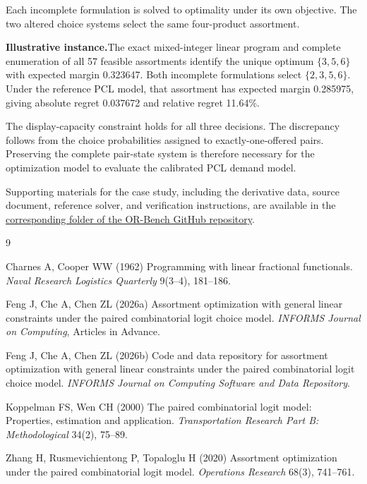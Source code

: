 \documentclass[10pt]{article}
\newcommand{\evidencebox}[1]{%
  \par\vspace{3pt}\noindent
  \colorbox{orlight}{%
    \parbox{\dimexpr\linewidth-2\fboxsep\relax}{%
      \small\textbf{Illustrative instance.}\hspace{0.35em}#1%
    }%
  }\par\vspace{4pt}
}
\begin{document}
Each incomplete formulation is solved to optimality under its own objective. The two altered choice systems select the same four-product assortment.

\evidencebox{The exact mixed-integer linear program and complete enumeration of all 57 feasible assortments identify the unique optimum $\{3,5,6\}$ with expected margin 0.323647. Both incomplete formulations select $\{2,3,5,6\}$. Under the reference PCL model, that assortment has expected margin 0.285975, giving absolute regret 0.037672 and relative regret 11.64\%.}

The display-capacity constraint holds for all three decisions. The discrepancy follows from the choice probabilities assigned to exactly-one-offered pairs. Preserving the complete pair-state system is therefore necessary for the optimization model to evaluate the calibrated PCL demand model.

Supporting materials for the case study, including the derivative data, source document, reference solver, and verification instructions, are available in the \href{https://github.com/Zhengzhong-You/OR-Bench/tree/main/problems/02_pcl_assortment}{corresponding folder of the OR-Bench GitHub repository}.

\begin{thebibliography}{9}\small

Charnes A, Cooper WW (1962)
Programming with linear fractional functionals.
\emph{Naval Research Logistics Quarterly} 9(3--4), 181--186.

Feng J, Che A, Chen ZL (2026a)
Assortment optimization with general linear constraints under the paired combinatorial logit choice model.
\emph{INFORMS Journal on Computing}, Articles in Advance.

Feng J, Che A, Chen ZL (2026b)
Code and data repository for assortment optimization with general linear constraints under the paired combinatorial logit choice model.
\emph{INFORMS Journal on Computing Software and Data Repository}.

Koppelman FS, Wen CH (2000)
The paired combinatorial logit model: Properties, estimation and application.
\emph{Transportation Research Part B: Methodological} 34(2), 75--89.

Zhang H, Rusmevichientong P, Topaloglu H (2020)
Assortment optimization under the paired combinatorial logit model.
\emph{Operations Research} 68(3), 741--761.

\end{thebibliography}
\end{document}
